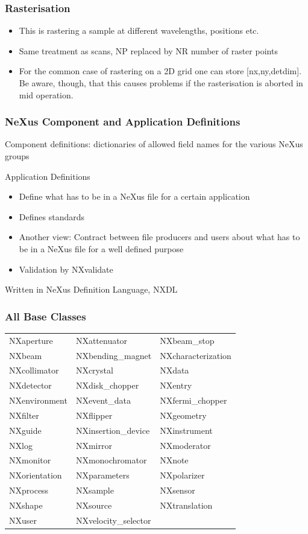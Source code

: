 \documentclass{beamer}
\newcommand{\changefont}[3] {
 \fontfamily{#1} \fontseries{#2} \fontshape{#3} \selectfont}
\begin{document}
\begin{frame}
\frametitle{Rasterisation}
\begin{itemize}
\item This is rastering a sample at different wavelengths, positions etc. 
\item Same treatment as scans, NP replaced by NR number of raster points
\item For the common case of rastering on a 2D grid one can store [nx,ny,detdim]. Be aware, though, that 
 this causes problems if the rasterisation is aborted in mid operation. 
\end{itemize}
\end{frame}


\begin{frame} \frametitle{NeXus Component and Application Definitions }
\begin{itemize}
\item Component definitions: 
 dictionaries of allowed field names for the various NeXus groups
{\changefont{cmr}{bx}{sc} 
\item Application Definitions
\begin{itemize}
\item Define what has to be in a NeXus file for a certain application
\item Defines standards
\item Another view: Contract between file producers and users about what has to be in 
 a NeXus file for a well defined purpose 
\item Validation by NXvalidate
\end{itemize}
}
\item Written in NeXus Definition Language, NXDL
\end{itemize}
\end{frame}

\begin{frame}
\frametitle{All Base Classes}
\begin{tabular}{lll}
NXaperture & NXattenuator & NXbeam\_stop \\
NXbeam     & NXbending\_magnet & NXcharacterization \\
NXcollimator & NXcrystal & NXdata \\
NXdetector   & NXdisk\_chopper & NXentry \\
NXenvironment & NXevent\_data & NXfermi\_chopper \\
NXfilter & NXflipper & NXgeometry \\
NXguide & NXinsertion\_device & NXinstrument \\
NXlog & NXmirror & NXmoderator \\
NXmonitor & NXmonochromator & NXnote \\
NXorientation & NXparameters & NXpolarizer\\
NXprocess & NXsample & NXsensor \\
NXshape & NXsource & NXtranslation\\
NXuser & NXvelocity\_selector & \\
\end{tabular}
\end{frame}
\end{document}

